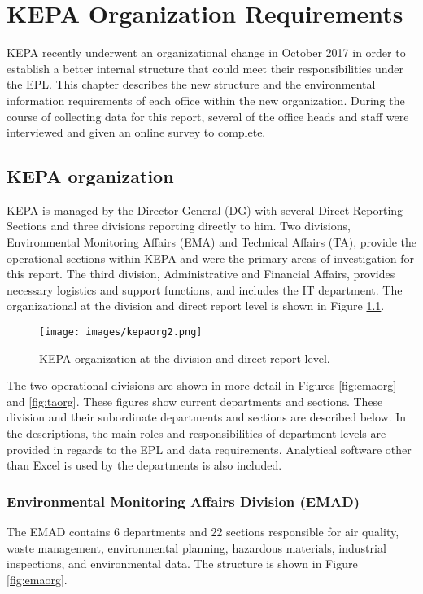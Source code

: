 \chapter{KEPA Organization Requirements}

KEPA recently underwent an organizational change in October 2017 in order to establish a better internal structure that could meet their responsibilities under the EPL. This chapter describes the new structure and the environmental information requirements of each office within the new organization.  During the course of collecting data for this report, several of the office heads and staff were interviewed and given an online survey to complete. 

\section{KEPA organization}

KEPA is managed by the Director General (DG) with several Direct Reporting Sections and three divisions reporting directly to him. Two divisions, Environmental Monitoring Affairs (EMA) and Technical Affairs (TA), provide the operational sections within KEPA and were the primary areas of investigation for this report. The third division, Administrative and Financial Affairs, provides necessary logistics and support functions, and includes the IT department. The organizational at the division and direct report level is shown in Figure \ref{fig:kepaorg}. 

%
\begin{figure}[H]
\centering
\texttt{[image: images/kepaorg2.png]} 
\caption{KEPA organization at the division and direct report level.}
\label{fig:kepaorg}
\end{figure}
%

The two operational divisions are shown in more detail in Figures \ref{fig:emaorg} and \ref{fig:taorg}. These figures show current departments and sections. These division and their subordinate departments and sections are described below. In the descriptions, the main roles and responsibilities of department levels are provided in regards to the EPL and data requirements.  Analytical software other than Excel is used by the departments is also included.

\subsection{Environmental Monitoring Affairs Division (EMAD)}
The EMAD contains 6 departments and 22 sections  responsible for air quality, waste management, environmental planning, hazardous materials, industrial inspections, and environmental data.  The structure is shown in  Figure \ref{fig:emaorg}.

